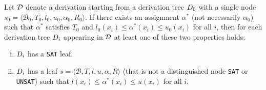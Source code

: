 \documentclass[a4paper]{llncs}
\newcommand{\basic}{\mathcal{B}}
\newcommand{\ub}{u}
\newcommand{\lb}{l}
\newcommand{\reluSet}{R}
\newcommand{\assignment}{\alpha{}}
\newcommand{\sat}{\texttt{SAT}}
\newcommand{\unsat}{\texttt{UNSAT}}
\begin{document}
\begin{lemma}
\label{lemma:narrowingBounds}
\sloppy
Let $\mathcal{D}$ denote a derivation starting from a derivation tree
$D_0$ with a single node  
$s_0 = \langle \basic_0, T_0, \lb_0, \ub_0, \assignment_0, \reluSet_0
\rangle$.
If there  exists an assignment $\assignment^*$ (not
necessarily $\assignment_0$) such that $\assignment^*$  satisfies $T_0$ and
$\lb_0(x_i)\leq \assignment^*(x_i)\leq \ub_0(x_i)$ for all $i$, then
for each derivation tree $D_i$ appearing in $\mathcal{D}$
at least one of these two properties holds:
\begin{enumerate}[(i)]
\item $D_i$ has  a \sat{} leaf.
\item $D_i$ has  a  leaf
$s = \langle \basic, T, \lb, \ub, \assignment, \reluSet \rangle$ 
(that is not a distinguished node \sat{} or \unsat{})
such that $\lb(x_i)\leq \assignment^*(x_i)\leq \ub(x_i)$ for all $i$.
\end{enumerate}
\end{lemma}
\end{document}
